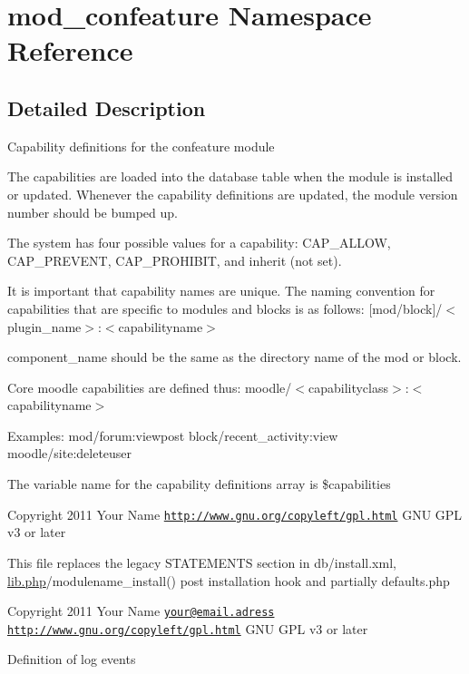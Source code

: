 \hypertarget{namespacemod__confeature}{\section{mod\-\_\-confeature Namespace Reference}
\label{namespacemod__confeature}
}


\subsection{Detailed Description}
Capability definitions for the confeature module

The capabilities are loaded into the database table when the module is installed or updated. Whenever the capability definitions are updated, the module version number should be bumped up.

The system has four possible values for a capability\-: C\-A\-P\-\_\-\-A\-L\-L\-O\-W, C\-A\-P\-\_\-\-P\-R\-E\-V\-E\-N\-T, C\-A\-P\-\_\-\-P\-R\-O\-H\-I\-B\-I\-T, and inherit (not set).

It is important that capability names are unique. The naming convention for capabilities that are specific to modules and blocks is as follows\-: \mbox{[}mod/block\mbox{]}/$<$plugin\-\_\-name$>$\-:$<$capabilityname$>$

component\-\_\-name should be the same as the directory name of the mod or block.

Core moodle capabilities are defined thus\-: moodle/$<$capabilityclass$>$\-:$<$capabilityname$>$

Examples\-: mod/forum\-:viewpost block/recent\-\_\-activity\-:view moodle/site\-:deleteuser

The variable name for the capability definitions array is \$capabilities

\begin{DoxyCopyright}{Copyright}
2011 Your Name  \href{http://www.gnu.org/copyleft/gpl.html}{\tt http\-://www.\-gnu.\-org/copyleft/gpl.\-html} G\-N\-U G\-P\-L v3 or later
\end{DoxyCopyright}
This file replaces the legacy S\-T\-A\-T\-E\-M\-E\-N\-T\-S section in db/install.\-xml, \hyperlink{lib_8php}{lib.\-php}/modulename\-\_\-install() post installation hook and partially defaults.\-php

\begin{DoxyCopyright}{Copyright}
2011 Your Name \href{mailto:your@email.adress}{\tt your@email.\-adress}  \href{http://www.gnu.org/copyleft/gpl.html}{\tt http\-://www.\-gnu.\-org/copyleft/gpl.\-html} G\-N\-U G\-P\-L v3 or later
\end{DoxyCopyright}
Definition of log events

